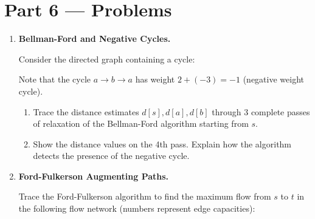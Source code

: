 \documentclass[12pt, a4paper]{book}
\begin{document}
\newpage

\section{Part 6 --- Problems}

\begin{problembox}
\begin{enumerate}[label=\textbf{P\arabic*.}]
  \item \textbf{Bellman-Ford and Negative Cycles.}
  
        Consider the directed graph containing a cycle:
        \begin{center}
        \end{center}
        Note that the cycle $a \to b \to a$ has weight $2 + (-3) = -1$ (negative weight cycle).
        \begin{enumerate}[label=(\alph*)]
          \item Trace the distance estimates $d[s], d[a], d[b]$ through 3 complete passes of relaxation of the Bellman-Ford algorithm starting from $s$.
          \item Show the distance values on the 4th pass. Explain how the algorithm detects the presence of the negative cycle.
        \end{enumerate}

  \item \textbf{Ford-Fulkerson Augmenting Paths.}
  
        Trace the Ford-Fulkerson algorithm to find the maximum flow from $s$ to $t$ in the following flow network (numbers represent edge capacities):
        \begin{center}
\end{center}
\end{enumerate}
\end{problembox}
\end{document}
